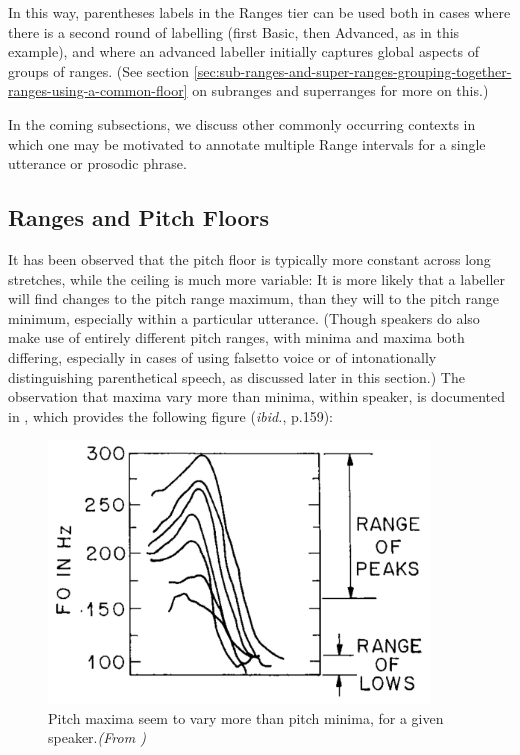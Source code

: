 \documentclass[11pt, twoside]{memoir}
\begin{document}
In this way, parentheses labels in the Ranges tier can be used both in cases where there is a second round of labelling (first Basic, then Advanced, as in this example), and where an advanced labeller initially captures global aspects of groups of ranges. (See section \ref{sec:sub-ranges-and-super-ranges-grouping-together-ranges-using-a-common-floor} on subranges and superranges for more on this.)

In the coming subsections, we discuss other commonly occurring contexts in which one may be motivated to annotate multiple Range intervals for a single utterance or prosodic phrase.

\subsection{Ranges and Pitch Floors}\label{sec:ranges-and-pitch-floors}

It has been observed that the pitch floor is typically more constant across long stretches, while the ceiling is much more variable: It is more likely that a labeller will find changes to the pitch range maximum, than they will to the pitch range minimum, especially within a particular utterance. (Though speakers do also make use of entirely different pitch ranges, with minima and maxima both differing, especially in cases of using falsetto voice or of intonationally distinguishing parenthetical speech, as discussed later in this section.) The observation that maxima vary more than minima, within speaker, is documented in \citealt{libermanpierrehumbert84}, which provides the following figure (\textit{ibid.}, p.159):

\begin{figure}[H]
\centering
%
\includegraphics[height=2.75in]{LibermanPierrehumbert-Ranges.png}
%
\caption{Pitch maxima seem to vary more than pitch minima, for a given speaker.\textit{(From \citealt{libermanpierrehumbert84})}%
\label{fig:Liberman Pierrehumbert Ranges}%
}
\end{figure}
\end{document}
